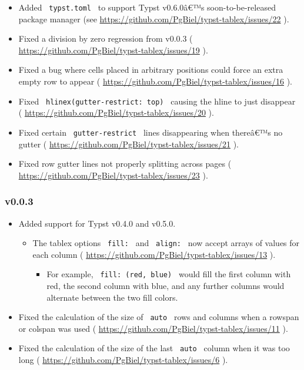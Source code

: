 \begin{itemize}
\tightlist
\item
  Added \texttt{\ typst.toml\ } to support Typst v0.6.0â€™s
  soon-to-be-released package manager (see
  \url{https://github.com/PgBiel/typst-tablex/issues/22} ).
\item
  Fixed a division by zero regression from v0.0.3 (
  \url{https://github.com/PgBiel/typst-tablex/issues/19} ).
\item
  Fixed a bug where cells placed in arbitrary positions could force an
  extra empty row to appear (
  \url{https://github.com/PgBiel/typst-tablex/issues/16} ).
\item
  Fixed \texttt{\ hlinex(gutter-restrict:\ top)\ } causing the hline to
  just disappear (
  \url{https://github.com/PgBiel/typst-tablex/issues/20} ).
\item
  Fixed certain \texttt{\ gutter-restrict\ } lines disappearing when
  thereâ€™s no gutter (
  \url{https://github.com/PgBiel/typst-tablex/issues/21} ).
\item
  Fixed row gutter lines not properly splitting across pages (
  \url{https://github.com/PgBiel/typst-tablex/issues/23} ).
\end{itemize}

\subsubsection{v0.0.3}\label{v0.0.3}

\begin{itemize}
\tightlist
\item
  Added support for Typst v0.4.0 and v0.5.0.

  \begin{itemize}
  \tightlist
  \item
    The tablex options \texttt{\ fill:\ } and \texttt{\ align:\ } now
    accept arrays of values for each column (
    \url{https://github.com/PgBiel/typst-tablex/issues/13} ).

    \begin{itemize}
    \tightlist
    \item
      For example, \texttt{\ fill:\ (red,\ blue)\ } would fill the first
      column with red, the second column with blue, and any further
      columns would alternate between the two fill colors.
    \end{itemize}
  \end{itemize}
\item
  Fixed the calculation of the size of \texttt{\ auto\ } rows and
  columns when a rowspan or colspan was used (
  \url{https://github.com/PgBiel/typst-tablex/issues/11} ).
\item
  Fixed the calculation of the size of the last \texttt{\ auto\ } column
  when it was too long (
  \url{https://github.com/PgBiel/typst-tablex/issues/6} ).
\end{itemize}

